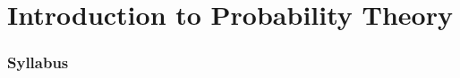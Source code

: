 \documentclass[
10pt, %
a4paper, %
]{report}
\begin{document}
\pagestyle{myheadings} %



\thispagestyle{plain} %

\printtitle %



\part{Introduction to Probability Theory}

\section*{Syllabus}
\end{document}
